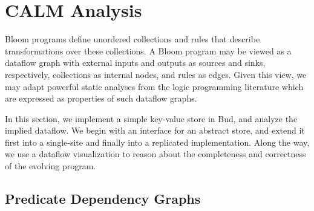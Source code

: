 \section{CALM Analysis}

Bloom programs define unordered collections and rules that describe transformations over 
these collections.  A Bloom program may be viewed as a dataflow graph with external 
inputs and outputs as sources and sinks, respectively, collections as internal nodes,
and rules as edges.  Given this view,
we may adapt powerful static analyses from the logic programming literature which are 
expressed as properties of such dataflow graphs.

In this section, we implement a simple key-value store in Bud, and analyze the implied
dataflow.  We begin with an interface for an abstract store, and extend it first into a single-site
and finally into a replicated implementation.  Along the way, we use a dataflow visualization
to reason about the completeness and correctness of the evolving program.

\subsection{Predicate Dependency Graphs}


